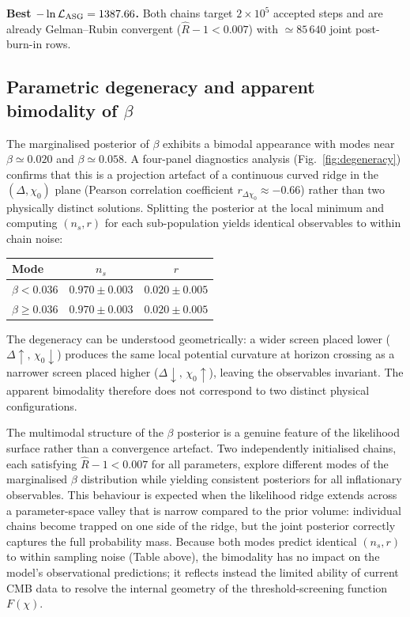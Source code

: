 \documentclass[
]{article}
\begin{document}
\textbf{Best \(-\ln\mathcal{L}_{\rm ASG} = 1387.66\).}
Both chains target \(2\times10^5\) accepted steps and are already
Gelman--Rubin convergent (\(\hat{R}-1 < 0.007\)) with \(\simeq 85\,640\)
joint post-burn-in rows.

\subsection{Parametric degeneracy and apparent bimodality of
\texorpdfstring{\(\beta\)}{beta}}\label{beta-bimodality}

The marginalised posterior of \(\beta\) exhibits a bimodal appearance
with modes near \(\beta \simeq 0.020\) and \(\beta \simeq 0.058\).
A four-panel diagnostics analysis (Fig.~\ref{fig:degeneracy}) confirms
that this is a projection artefact of a continuous curved ridge in the
\((\Delta,\chi_{0})\) plane (Pearson correlation coefficient
\(r_{\Delta\chi_{0}} \approx -0.66\)) rather than two physically
distinct solutions. Splitting the posterior at the local minimum and
computing \((n_{s},r)\) for each sub-population yields identical
observables to within chain noise:

\begin{longtable}[]{@{}lcc@{}}
\toprule\noalign{}
Mode & \(n_{s}\) & \(r\) \\
\midrule\noalign{}
\endhead
\bottomrule\noalign{}
\endlastfoot
\(\beta < 0.036\) & \(0.970 \pm 0.003\) & \(0.020 \pm 0.005\) \\
\(\beta \geq 0.036\) & \(0.970 \pm 0.003\) & \(0.020 \pm 0.005\) \\
\end{longtable}

The degeneracy can be understood geometrically: a wider screen placed
lower (\(\Delta\uparrow,\,\chi_{0}\downarrow\)) produces the same
local potential curvature at horizon crossing as a narrower screen
placed higher (\(\Delta\downarrow,\,\chi_{0}\uparrow\)), leaving
the observables invariant. The apparent bimodality therefore does not
correspond to two distinct physical configurations.

The multimodal structure of the \(\beta\) posterior is a genuine
feature of the likelihood surface rather than a convergence artefact.
Two independently initialised chains, each satisfying
\(\hat{R}-1 < 0.007\) for all parameters, explore different modes of
the marginalised \(\beta\) distribution while yielding consistent
posteriors for all inflationary observables. This behaviour is expected
when the likelihood ridge extends across a parameter-space valley that
is narrow compared to the prior volume: individual chains become
trapped on one side of the ridge, but the joint posterior correctly
captures the full probability mass. Because both modes predict
identical \((n_{s}, r)\) to within sampling noise (Table above), the
bimodality has no impact on the model's observational predictions; it
reflects instead the limited ability of current CMB data to resolve the
internal geometry of the threshold-screening function
\(F(\chi)\).
\end{document}
